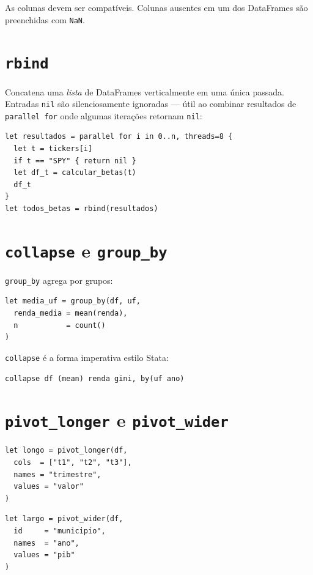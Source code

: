 As colunas devem ser compatíveis. Colunas ausentes em um dos DataFrames são
preenchidas com \texttt{NaN}.

\section{\texttt{rbind}}

Concatena uma \textit{lista} de DataFrames verticalmente em uma única
passada. Entradas \texttt{nil} são silenciosamente ignoradas --- útil ao
combinar resultados de \texttt{parallel for} onde algumas iterações
retornam \texttt{nil}:

\begin{lstlisting}[caption={rbind com parallel for}]
let resultados = parallel for i in 0..n, threads=8 {
  let t = tickers[i]
  if t == "SPY" { return nil }
  let df_t = calcular_betas(t)
  df_t
}
let todos_betas = rbind(resultados)
\end{lstlisting}

\section{\texttt{collapse} e \texttt{group\_by}}

\lstinline{group_by} agrega por grupos:

\begin{lstlisting}[caption={Agregação por grupo}]
let media_uf = group_by(df, uf,
  renda_media = mean(renda),
  n           = count()
)
\end{lstlisting}

\lstinline{collapse} é a forma imperativa estilo Stata:

\begin{lstlisting}
collapse df (mean) renda gini, by(uf ano)
\end{lstlisting}

\section{\texttt{pivot\_longer} e \texttt{pivot\_wider}}

\begin{lstlisting}[caption={Formato largo para longo}]
let longo = pivot_longer(df,
  cols  = ["t1", "t2", "t3"],
  names = "trimestre",
  values = "valor"
)
\end{lstlisting}

\begin{lstlisting}[caption={Formato longo para largo}]
let largo = pivot_wider(df,
  id     = "municipio",
  names  = "ano",
  values = "pib"
)
\end{lstlisting}

